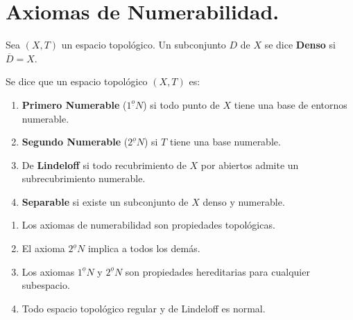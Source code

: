 \documentclass[cursovd_portada.tex]{subfiles}
\begin{document}
\section{Axiomas de Numerabilidad.}
\begin{defi}
Sea $(X,T)$ un espacio topol\'{o}gico. Un subconjunto $D$ de $X$ se dice {\bf Denso} si $\overline{D}=X$.
\end{defi}
\begin{defi}
Se dice que un espacio topol\'{o}gico $(X,T)$ es:
\begin{enumerate}
\item {\bf Primero Numerable} ($1^{\underline{o}}N$) si todo punto de $X$ tiene una base de entornos numerable.
\item {\bf Segundo Numerable} ($2^{\underline{o}}N$) si $T$ tiene una base numerable.
\item De {\bf Lindeloff} si todo recubrimiento de $X$ por abiertos admite un subrecubrimiento numerable.
\item {\bf Separable} si existe un subconjunto de $X$ denso y numerable.
\end{enumerate}
\end{defi}
\begin{prop}
\begin{enumerate}
\item Los axiomas de numerabilidad son propiedades to\-po\-l\'{o}\-gi\-cas.
\item El axioma $2^{\underline{o}}N$ implica a todos los dem\'{a}s.
\item Los axiomas $1^{\underline{o}}N$ y $2^{\underline{o}}N$ son propiedades hereditarias para cualquier subespacio.
\item Todo espacio topol\'{o}gico regular y de Lindeloff es normal.
\end{enumerate}
\end{prop}
\end{document}
